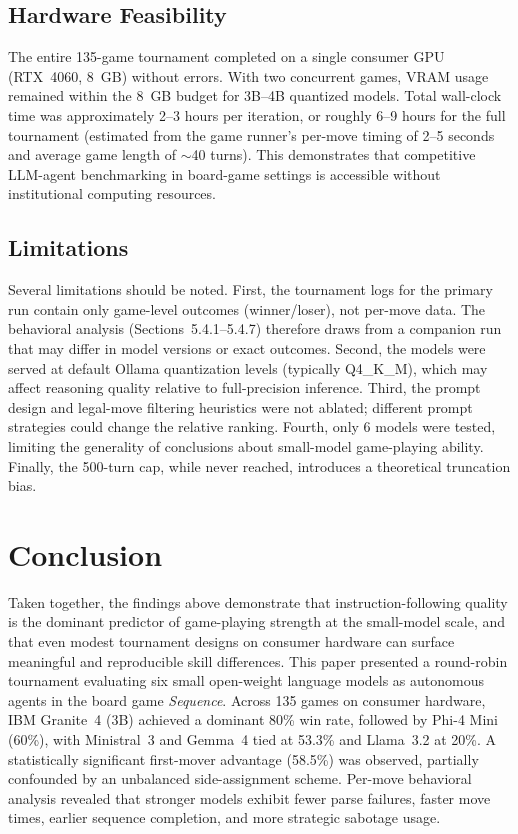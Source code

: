 \documentclass[11pt]{article}
\begin{document}
\subsection{Hardware Feasibility}

The entire 135-game tournament completed on a single consumer GPU (RTX~4060, 8~GB) without errors. With two concurrent games, VRAM usage remained within the 8~GB budget for 3B--4B quantized models. Total wall-clock time was approximately 2--3 hours per iteration, or roughly 6--9 hours for the full tournament (estimated from the game runner's per-move timing of 2--5 seconds and average game length of $\sim$40 turns). This demonstrates that competitive LLM-agent benchmarking in board-game settings is accessible without institutional computing resources.

\subsection{Limitations}

Several limitations should be noted. First, the tournament logs for the primary run contain only game-level outcomes (winner/loser), not per-move data. The behavioral analysis (Sections~5.4.1--5.4.7) therefore draws from a companion run that may differ in model versions or exact outcomes. Second, the models were served at default Ollama quantization levels (typically Q4\_K\_M), which may affect reasoning quality relative to full-precision inference. Third, the prompt design and legal-move filtering heuristics were not ablated; different prompt strategies could change the relative ranking. Fourth, only 6 models were tested, limiting the generality of conclusions about small-model game-playing ability. Finally, the 500-turn cap, while never reached, introduces a theoretical truncation bias.

\section{Conclusion}
\label{sec:conclusion}

Taken together, the findings above demonstrate that instruction-following quality is the dominant predictor of game-playing strength at the small-model scale, and that even modest tournament designs on consumer hardware can surface meaningful and reproducible skill differences. This paper presented a round-robin tournament evaluating six small open-weight language models as autonomous agents in the board game \textit{Sequence}. Across 135 games on consumer hardware, IBM Granite~4 (3B) achieved a dominant 80\% win rate, followed by Phi-4 Mini (60\%), with Ministral~3 and Gemma~4 tied at 53.3\% and Llama~3.2 at 20\%. A statistically significant first-mover advantage (58.5\%) was observed, partially confounded by an unbalanced side-assignment scheme. Per-move behavioral analysis revealed that stronger models exhibit fewer parse failures, faster move times, earlier sequence completion, and more strategic sabotage usage.
\end{document}
